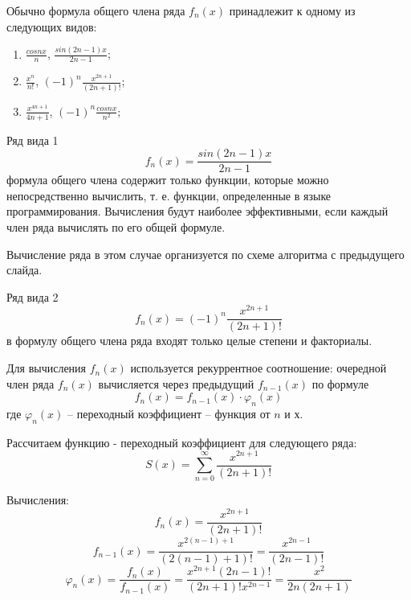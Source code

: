 \documentclass{beamer}
\begin{document}
\begin{frame}
Обычно формула общего члена ряда $f_n(x)$ принадлежит к одному из следующих видов:
\begin{enumerate}
\item $\frac{cos{nx}}{n}$, $\frac{sin(2n-1)x}{2n-1}$;
\item $\frac{x^n}{n!}$, $(-1)^n\frac{x^{2n+1}}{(2n+1)!}$;
\item $\frac{x^{4n+1}}{4n+1}$, $(-1)^n\frac{cos{nx}}{n^2}$;
\end{enumerate}
\begin{block}{Ряд вида 1}
\[f_n(x)=\frac{sin(2n-1)x}{2n-1}\]
формула общего члена содержит только функции, которые можно непосредственно вычислить, т. е. функции, определенные в языке программирования. Вычисления будут наиболее эффективными, если каждый член ряда вычислять по его общей формуле. \end{block}
Вычисление ряда в этом случае организуется по схеме алгоритма с предыдущего слайда.
\end{frame}

\begin{frame}
\begin{block}{Ряд вида 2}
\[f_n(x)=(-1)^n\frac{x^{2n+1}}{(2n+1)!}\]
в формулу общего члена ряда входят только целые степени и факториалы.
\end{block}
Для вычисления $f_n(x)$ используется рекуррентное соотношение: очередной член ряда $f_n(x)$ вычисляется через предыдущий $f_{n-1}(x)$ по формуле 
\[f_n(x) = f_{n-1}(x)\cdot \varphi_n(x)\]
где $\varphi_n(x)$ – переходный коэффициент – функция от $n$ и $х$.
\end{frame}

\begin{frame}
Рассчитаем функцию - переходный коэффициент для следующего ряда:
\[S(x)= \sum\limits_{n=0}^\infty \frac{x^{2n+1}}{(2n+1)!}\]

Вычисления:
\[f_n(x)=\frac{x^{2n+1}}{(2n+1)!}\]
\[f_{n-1}(x)=\frac{x^{2(n-1)+1}}{(2(n-1)+1)!}=\frac{x^{2n-1}}{(2n-1)!}\]
\[\varphi_n(x)=\frac{f_n(x)}{f_{n-1}(x)}= \frac{x^{2n+1}(2n-1)!}{(2n+1)!x^{2n-1}}=\frac{x^2}{2n(2n+1)}\]
\end{frame}
\end{document}

